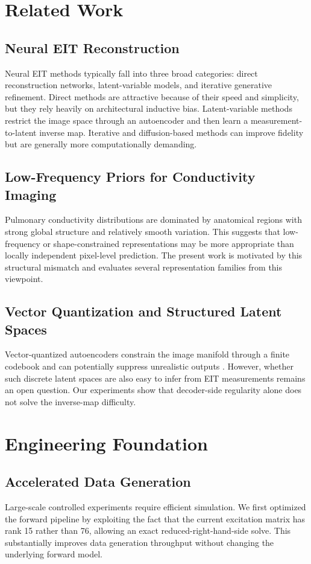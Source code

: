 \documentclass[11pt,a4paper]{article}
\begin{document}
\section{Related Work}
\subsection{Neural EIT Reconstruction}
Neural EIT methods typically fall into three broad categories: direct reconstruction networks, latent-variable models, and iterative generative refinement. Direct methods are attractive because of their speed and simplicity, but they rely heavily on architectural inductive bias. Latent-variable methods restrict the image space through an autoencoder and then learn a measurement-to-latent inverse map. Iterative and diffusion-based methods can improve fidelity but are generally more computationally demanding.

\subsection{Low-Frequency Priors for Conductivity Imaging}
Pulmonary conductivity distributions are dominated by anatomical regions with strong global structure and relatively smooth variation. This suggests that low-frequency or shape-constrained representations may be more appropriate than locally independent pixel-level prediction. The present work is motivated by this structural mismatch and evaluates several representation families from this viewpoint.

\subsection{Vector Quantization and Structured Latent Spaces}
Vector-quantized autoencoders constrain the image manifold through a finite codebook and can potentially suppress unrealistic outputs \cite{oord2017vqvae}. However, whether such discrete latent spaces are also easy to infer from EIT measurements remains an open question. Our experiments show that decoder-side regularity alone does not solve the inverse-map difficulty.

\section{Engineering Foundation}
\subsection{Accelerated Data Generation}
Large-scale controlled experiments require efficient simulation. We first optimized the forward pipeline by exploiting the fact that the current excitation matrix has rank 15 rather than 76, allowing an exact reduced-right-hand-side solve. This substantially improves data generation throughput without changing the underlying forward model.
\end{document}
